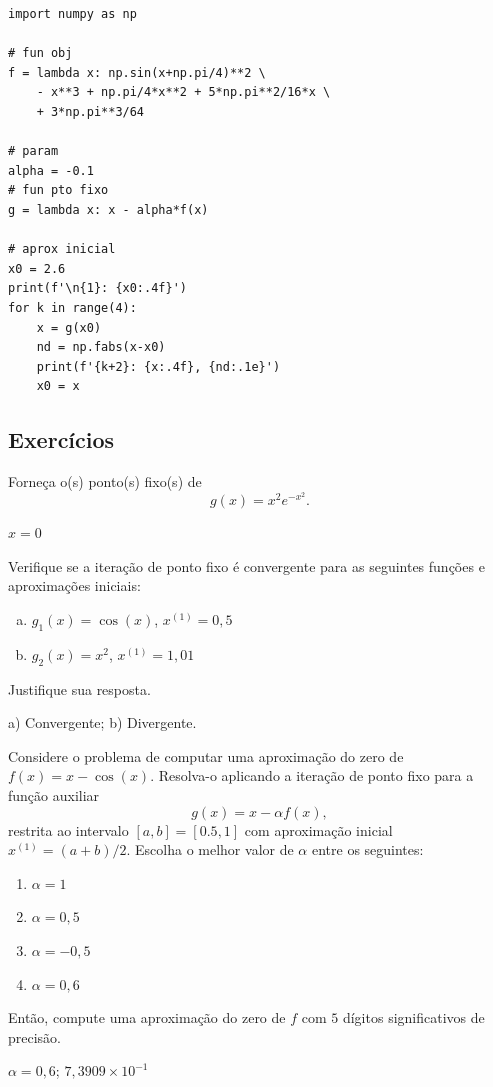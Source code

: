 \begin{ex}
\begin{lstlisting}
import numpy as np

# fun obj
f = lambda x: np.sin(x+np.pi/4)**2 \
    - x**3 + np.pi/4*x**2 + 5*np.pi**2/16*x \
    + 3*np.pi**3/64

# param
alpha = -0.1
# fun pto fixo
g = lambda x: x - alpha*f(x)

# aprox inicial
x0 = 2.6
print(f'\n{1}: {x0:.4f}')
for k in range(4):
    x = g(x0)
    nd = np.fabs(x-x0)
    print(f'{k+2}: {x:.4f}, {nd:.1e}')
    x0 = x
\end{lstlisting}
\end{ex}

\subsection{Exercícios}

\begin{exer}
  Forneça o(s) ponto(s) fixo(s) de
  \begin{equation}
    g(x) = x^2e^{-x^2}.
  \end{equation}
\end{exer}
\begin{resp}
  $x=0$
\end{resp}

\begin{exer}
  Verifique se a iteração de ponto fixo é convergente para as seguintes funções e aproximações iniciais:
  \begin{enumerate}[a)]
  \item $g_1(x) = \cos(x)$, $x^{(1)} = 0,5$
  \item $g_2(x) = x^2$, $x^{(1)} = 1,01$
  \end{enumerate}
  Justifique sua resposta.
\end{exer}
\begin{resp}
  a) Convergente; b) Divergente.
\end{resp}

\begin{exer}
  Considere o problema de computar uma aproximação do zero de $f(x)=x-\cos(x)$. Resolva-o aplicando a iteração de ponto fixo para a função auxiliar
  \begin{equation}
    g(x) = x - \alpha f(x),
  \end{equation}
restrita ao intervalo $[a, b] = [0.5, 1]$ com aproximação inicial $x^{(1)}=(a+b)/2$. Escolha o melhor valor de $\alpha$ entre os seguintes:
\begin{enumerate}
\item $\alpha = 1$
\item $\alpha = 0,5$
\item $\alpha = -0,5$
\item $\alpha = 0,6$
\end{enumerate}
Então, compute uma aproximação do zero de $f$ com $5$ dígitos significativos de precisão.
\end{exer}
\begin{resp}
  $\alpha=0,6$; $7,3909\times 10^{-1}$
\end{resp}

